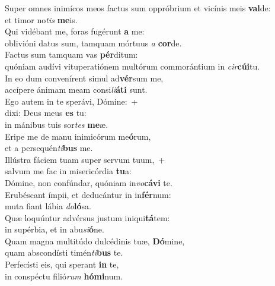 \evenverse Super omnes inimícos meos factus sum oppróbrium et vicínis meis \textbf{val}de:~\*\\
\evenverse et timor no\textit{tis} \textbf{me}is.\\
\oddverse Qui vidébant me, foras fugérunt \textbf{a} me:~\*\\
\oddverse oblivióni datus sum, tamquam mórtuus \textit{a} \textbf{cor}de.\\
\evenverse Factus sum tamquam vas \textbf{pér}ditum:~\*\\
\evenverse quóniam audívi vituperatiónem multórum commorántium in \textit{cir}\textbf{cú}\textbf{i}tu.\\
\oddverse In eo dum convenírent simul ad\textbf{vér}sum me,~\*\\
\oddverse accípere ánimam meam consi\textit{li}\textbf{á}\textbf{ti} sunt.\\
\evenverse Ego autem in te sperávi, Dómine:~+\\
\evenverse  dixi: Deus meus \textbf{es} tu:~\*\\
\evenverse in mánibus tuis sor\textit{tes} \textbf{me}æ.\\
\oddverse Eripe me de manu inimicórum me\textbf{ó}rum,~\*\\
\oddverse et a persequén\textit{ti}\textbf{bus} me.\\
\evenverse Illústra fáciem tuam super servum tuum,~+\\
\evenverse  salvum me fac in misericórdia \textbf{tu}a:~\*\\
\evenverse Dómine, non confúndar, quóniam in\textit{vo}\textbf{cá}\textbf{vi} te.\\
\oddverse Erubéscant ímpii, et deducántur in in\textbf{fér}num:~\*\\
\oddverse muta fiant lábia \textit{do}\textbf{ló}sa.\\
\evenverse Quæ loquúntur advérsus justum iniqui\textbf{tá}tem:~\*\\
\evenverse in supérbia, et in abu\textit{si}\textbf{ó}ne.\\
\oddverse Quam magna multitúdo dulcédinis tuæ, \textbf{Dó}mine,~\*\\
\oddverse quam abscondísti timén\textit{ti}\textbf{bus} te.\\
\evenverse Perfecísti eis, qui sperant \textbf{in} te,~\*\\
\evenverse in conspéctu filió\textit{rum} \textbf{hó}\textbf{mi}num.\\
